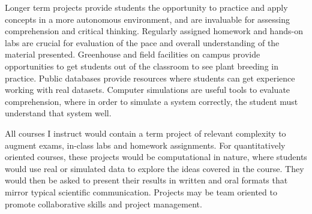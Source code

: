\documentclass[11pt]{article}
\begin{document}

Longer term projects provide students the opportunity to practice and apply concepts in a more autonomous environment, and are invaluable for assessing comprehension and critical thinking. Regularly assigned homework and hands-on labs are crucial for evaluation of the pace and overall understanding of the material presented. Greenhouse and field facilities on campus provide opportunities to get students out of the classroom to see plant breeding in practice. Public databases provide resources where students can get experience working with real datasets. Computer simulations are useful tools to evaluate comprehension, where in order to simulate a system correctly, the student must understand that system well.

All courses I instruct would contain a term project of relevant complexity to augment exams, in-class labs and homework assignments. For quantitatively oriented courses, these projects would be computational in nature, where students would use real or simulated data to explore the ideas covered in the course. They would then be asked to present their results in written and oral formats that mirror typical scientific communication. Projects may be team oriented to promote collaborative skills and project management. %

\end{document}
